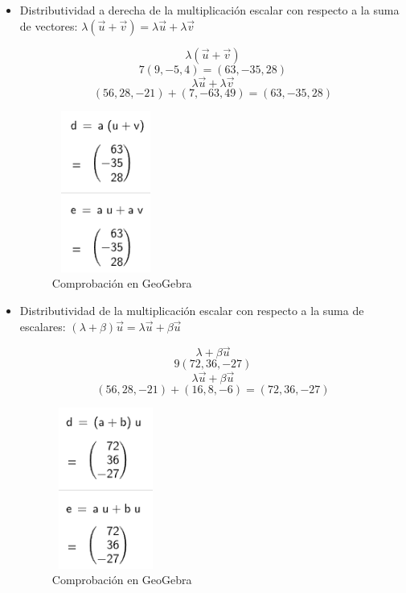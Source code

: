 \begin{itemize}
    \FloatBarrier
    \item Distributividad a derecha de la multiplicación escalar con respecto a la suma de vectores: \(\lambda(\vec{u}+\vec{v})=\lambda\vec{u}+\lambda\vec{v}\)
    
    \[
        \lambda(\vec{u}+\vec{v})
    \]
    \[
        7(9,-5,4)=(63,-35,28)
    \]
    \[
        \lambda\vec{u}+\lambda\vec{v}
    \]
    \[
        (56,28,-21)+(7,-63,49)=(63,-35,28)
    \]
    \begin{figure}[ht!]
        \centering
        \includegraphics[width=100pt,height=150pt]{img/imagen8.png}
        \caption{Comprobación en GeoGebra}
    \end{figure}

    \FloatBarrier
    \item Distributividad de la multiplicación escalar con respecto a la suma de escalares: \((\lambda+\beta)\vec{u}=\lambda\vec{u}+\beta\vec{u}\)
    
    \[
        \lambda+\beta\vec{u}
    \]
    \[
        9(72,36,-27)
    \]
    \[
        \lambda\vec{u}+\beta\vec{u}
    \]
    \[
        (56,28,-21)+(16,8,-6)=(72,36,-27)
    \]
    \begin{figure}[ht!]
        \centering
        \includegraphics[width=100pt,height=150pt]{img/imagen9.png}
        \caption{Comprobación en GeoGebra}
    \end{figure}
\end{itemize}